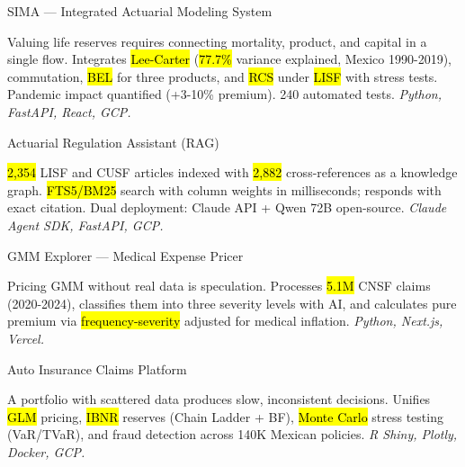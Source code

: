 \documentclass[10pt, letterpaper]{awesome-cv}
\begin{document}
\begin{cventries}

  \cventry
    {SIMA — Integrated Actuarial Modeling System}
    {}
    {}
    {}
    {
      \begin{cvitems}
        \item {Valuing life reserves requires connecting mortality, product, and capital in a single flow. Integrates \hl{Lee-Carter} (\hl{77.7\%} variance explained, Mexico 1990-2019), commutation, \hl{BEL} for three products, and \hl{RCS} under \hl{LISF} with stress tests. Pandemic impact quantified (+3-10\% premium). 240 automated tests. \textit{Python, FastAPI, React, GCP.}}
      \end{cvitems}
    }

  \cventry
    {Actuarial Regulation Assistant (RAG)}
    {}
    {}
    {}
    {
      \begin{cvitems}
        \item {\hl{2,354} LISF and CUSF articles indexed with \hl{2,882} cross-references as a knowledge graph. \hl{FTS5/BM25} search with column weights in milliseconds; responds with exact citation. Dual deployment: Claude API + Qwen 72B open-source. \textit{Claude Agent SDK, FastAPI, GCP.}}
      \end{cvitems}
    }

  \cventry
    {GMM Explorer — Medical Expense Pricer}
    {}
    {}
    {}
    {
      \begin{cvitems}
        \item {Pricing GMM without real data is speculation. Processes \hl{5.1M} CNSF claims (2020-2024), classifies them into three severity levels with AI, and calculates pure premium via \hl{frequency-severity} adjusted for medical inflation. \textit{Python, Next.js, Vercel.}}
      \end{cvitems}
    }

  \cventry
    {Auto Insurance Claims Platform}
    {}
    {}
    {}
    {
      \begin{cvitems}
        \item {A portfolio with scattered data produces slow, inconsistent decisions. Unifies \hl{GLM} pricing, \hl{IBNR} reserves (Chain Ladder + BF), \hl{Monte Carlo} stress testing (VaR/TVaR), and fraud detection across 140K Mexican policies. \textit{R Shiny, Plotly, Docker, GCP.}}
      \end{cvitems}
    }

\end{cventries}
\end{document}
